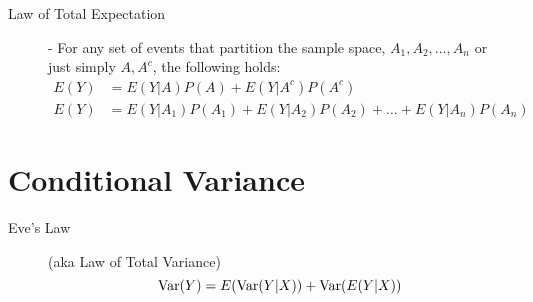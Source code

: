 \documentclass[11pt]{article}
\begin{document}
\begin{description}
  \item[Law of Total Expectation] - For any set of events that partition the sample space, $A_1, A_2, \dots, A_n$ or just simply $A, A^c$, the following holds:
  \begin{align*}
    E(Y) &= E(Y|A)P(A) + E(Y|A^c)P(A^c) \\
    E(Y) &= E(Y|A_1)P(A_1) + E(Y|A_2)P(A_2) + \dots + E(Y|A_n)P(A_n)
  \end{align*}
\end{description}
\section*{Conditional Variance}
\begin{description}
  \item[Eve's Law] (aka Law of Total Variance) \quad
  \[\textrm{Var}(Y) = E(\textrm{Var}(Y|X)) + \textrm{Var}(E(Y|X))\]
\end{description}
\end{document}
